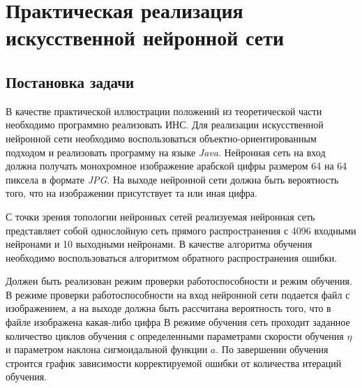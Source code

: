 \section{Практическая реализация искусственной нейронной сети} 
\subsection{Постановка задачи}

В качестве практической иллюстрации положений из теоретической части необходимо программно реализовать ИНС.
Для реализации искусственной нейронной сети необходимо воспользоваться объектно-ориентированным подходом и реализовать программу на языке {\it Java}.
Нейронная сеть на вход должна получать монохромное изображение арабской цифры размером 64 на 64 пиксела в формате {\it JPG}.
На выходе нейронной сети должна быть вероятность того, что на изображении присутствует та или иная цифра.

С точки зрения топологии нейронных сетей реализуемая нейронная сеть представляет собой однослойную сеть прямого распространения с 4096 входными нейронами и 10 выходными нейронами.
В качестве алгоритма обучения необходимо воспользоваться алгоритмом обратного распространения ошибки.

Должен быть реализован режим проверки работоспособности и режим обучения.
В режиме проверки работоспособности на вход нейронной сети подается файл с изображением, а на выходе должна быть рассчитана вероятность того, что в файле изображена какая-либо цифра
В режиме обучения сеть проходит заданное количество циклов обучения с определенными параметрами скорости обучения $\eta$ и параметром наклона сигмоидальной функции $a$.
По завершении обучения строится график зависимости корректируемой ошибки от количества итераций обучения.